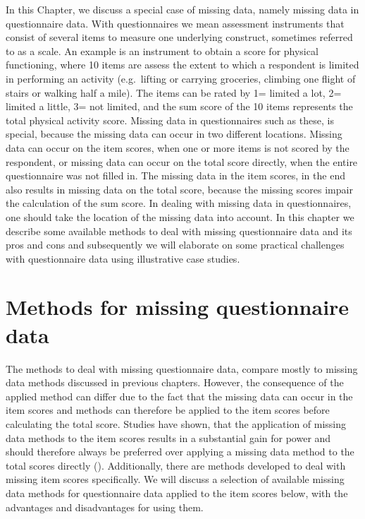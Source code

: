 \documentclass[
]{book}
\begin{document}
In this Chapter, we discuss a special case of missing data, namely missing data in questionnaire data. With questionnaires we mean assessment instruments that consist of several items to measure one underlying construct, sometimes referred to as a scale. An example is an instrument to obtain a score for physical functioning, where 10 items are assess the extent to which a respondent is limited in performing an activity (e.g.~lifting or carrying groceries, climbing one flight of stairs or walking half a mile). The items can be rated by 1= limited a lot, 2= limited a little, 3= not limited, and the sum score of the 10 items represents the total physical activity score. Missing data in questionnaires such as these, is special, because the missing data can occur in two different locations. Missing data can occur on the item scores, when one or more items is not scored by the respondent, or missing data can occur on the total score directly, when the entire questionnaire was not filled in. The missing data in the item scores, in the end also results in missing data on the total score, because the missing scores impair the calculation of the sum score. In dealing with missing data in questionnaires, one should take the location of the missing data into account. In this chapter we describe some available methods to deal with missing questionnaire data and its pros and cons and subsequently we will elaborate on some practical challenges with questionnaire data using illustrative case studies.

\hypertarget{methods-for-missing-questionnaire-data}{%
\section{Methods for missing questionnaire data}\label{methods-for-missing-questionnaire-data}}

The methods to deal with missing questionnaire data, compare mostly to missing data methods discussed in previous chapters. However, the consequence of the applied method can differ due to the fact that the missing data can occur in the item scores and methods can therefore be applied to the item scores before calculating the total score. Studies have shown, that the application of missing data methods to the item scores results in a substantial gain for power and should therefore always be preferred over applying a missing data method to the total scores directly (\citet{Eekhout2014}). Additionally, there are methods developed to deal with missing item scores specifically. We will discuss a selection of available missing data methods for questionnaire data applied to the item scores below, with the advantages and disadvantages for using them.
\end{document}
